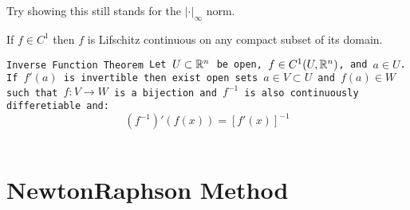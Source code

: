 \documentclass[11pt,a4paper]{article}
\begin{document}
\noindent Try showing this still stands for the $|\cdot|_\infty$ norm.
\begin{corollary}
  If $f \in C^1$ then $f$ is Lifschitz continuous on any compact
  subset of its domain.
\end{corollary}
\begin{theorem}
\tt{Inverse Function Theorem}
Let $U \subset \mathbb{R}^n$ be open,
$f \in C^1(U,\mathbb{R}^n)$, and $a \in U$. If $f'(a)$ is invertible then
exist open sets $a \in V \subset U$ and $f(a) \in W$ such that
$f \colon V \to W$ is a bijection and $f^{-1}$ is also continuously 
differetiable and:
\[
  (f^{-1})'(f(x)) = [f'(x)]^{-1}
\]
\end{theorem}


\newpage

\section{Newton\textendash{}Raphson Method}

\newpage
\end{document}
